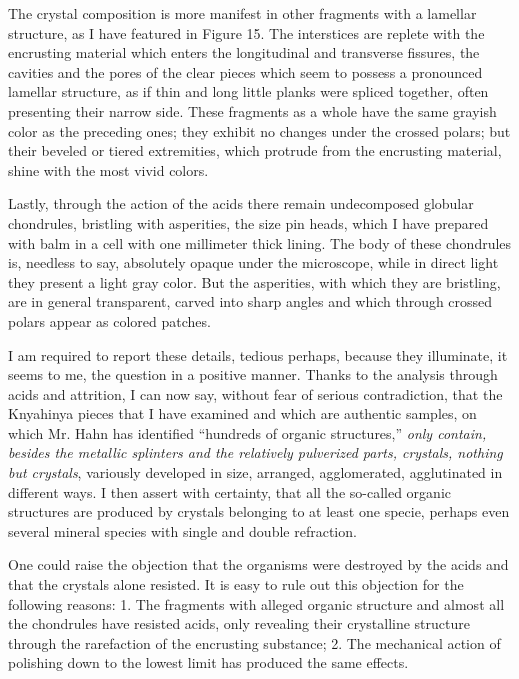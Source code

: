 \documentclass[a4paper, 12pt, oneside]{article}
\begin{document}
The crystal composition is more manifest in other fragments with a lamellar structure, as I have featured in Figure 15. The interstices are replete with the encrusting material which enters the longitudinal and transverse fissures, the cavities and the pores of the clear pieces which seem to possess a pronounced lamellar structure, as if thin and long little planks were spliced together, often presenting their narrow side. These fragments as a whole have the same grayish color as the preceding ones; they exhibit no changes under the crossed polars; but their beveled or tiered extremities, which protrude from the encrusting material, shine with the most vivid colors.

Lastly, through the action of the acids there remain undecomposed globular chondrules, bristling with asperities, the size pin heads, which I have prepared with balm in a cell with one millimeter thick lining. The body of these chondrules is, needless to say, absolutely opaque under the microscope, while in direct light they present a light gray color. But the asperities, with which they are bristling, are in general transparent, carved into sharp angles and which through crossed polars appear as colored patches.

I am required to report these details, tedious perhaps, because they illuminate, it seems to me, the question in a positive manner. Thanks to the analysis through acids and attrition, I can now say, without fear of serious contradiction, that the Knyahinya pieces that I have examined and which are authentic samples, on which Mr. Hahn has identified ``hundreds of organic structures,'' \emph{only contain, besides the metallic splinters and the relatively pulverized parts, crystals, nothing but crystals}, variously developed in size, arranged, agglomerated, agglutinated in different ways. I then assert with certainty, that all the so-called organic structures are produced by crystals belonging to at least one specie, perhaps even several mineral species with single and double refraction.

One could raise the objection that the organisms were destroyed by the acids and that the crystals alone resisted. It is easy to rule out this objection for the following reasons: 1. The fragments with alleged organic structure and almost all the chondrules have resisted acids, only revealing their crystalline structure through the rarefaction of the encrusting substance; 2. The mechanical action of polishing down to the lowest limit has produced the same effects.
\end{document}
